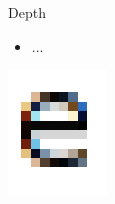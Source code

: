 \documentclass{lug}
\newcommand{\splitslide}[4]{
    \noindent
    \begin{minipage}{#1 \textwidth - #2 }
        #3
    \end{minipage}%
    \hspace{ \dimexpr #2 * 2 \relax }%
    \begin{minipage}{\textwidth - #1 \textwidth - #2 }
        #4
    \end{minipage}
}
\begin{document}
\begin{frame}{Depth}
    \splitslide{0.65}{.7em}{
        \small
        \begin{itemize}
            \item ...
        \end{itemize}
    }{
        \includegraphics[width=\textwidth]{graphics/subpixel_e}
    }
\end{frame}
\end{document}
